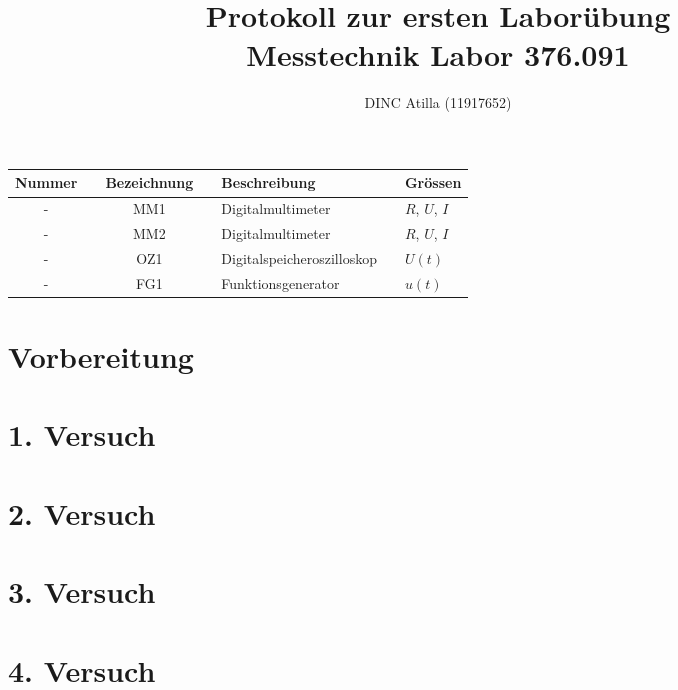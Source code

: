 \documentclass[a4paper]{article}
\title{Protokoll zur ersten Laborübung\\Messtechnik Labor 376.091}
\author{DINC Atilla (11917652)}
\begin{document}
\normalsize
\maketitle
\tableofcontents
\begin{center}
\begin{tabular}{|c| c| c| c|}
    Nummer  && Bezeichnung  && Beschreibung                 && Grössen \\ 
    \hline
    -       && MM1          && Digitalmultimeter            && $R$, $U$, $I$ \\
    -       && MM2          && Digitalmultimeter            &&  $R$, $U$, $I$ \\
    -       && OZ1          && Digitalspeicheroszilloskop   && $U(t)$ \\
    -       && FG1          && Funktionsgenerator           && $u(t)$
\end{tabular}
\end{center}
\newpage


\section{Vorbereitung}

\section{1. Versuch}
\section{2. Versuch}
\section{3. Versuch}
\section{4. Versuch}
\end{document}
